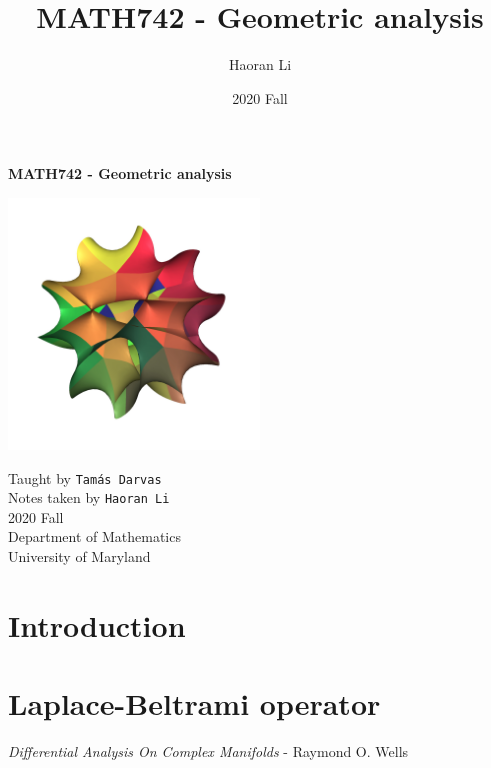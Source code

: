 \documentclass[a4paper,10pt]{article}
\title{MATH742 - Geometric analysis}
\author{Haoran Li}
\date{2020 Fall}
\begin{document}
\sloppy %

\begin{titlepage}
\begin{center}
\vspace*{1cm}
\LARGE
\textbf{MATH742 - Geometric analysis} \\
\vspace{2cm}
\begin{center}
\includegraphics[width=0.5\textwidth]{Pictures/Calabi_Yau.jpg}
\end{center}
\vspace{2cm}
\normalsize
Taught by \texttt{Tam\'as Darvas} \\
Notes taken by \texttt{Haoran Li} \\
2020 Fall \\
\vspace{2cm}
Department of Mathematics\\
University of Maryland\\
\end{center}
\end{titlepage}

\tableofcontents
\newpage

\section{Introduction}

\newpage

\section{Laplace-Beltrami operator}

\newpage

\begin{thebibliography}{}

\textit{Differential Analysis On Complex Manifolds} - Raymond O. Wells

\end{thebibliography}

\printindex
\newpage
\end{document}
